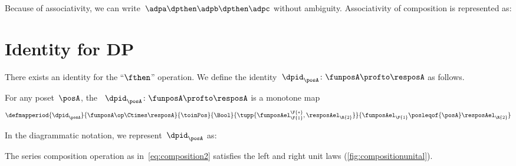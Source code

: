 Because of associativity, we can write~$\adpa\dpthen\adpb\dpthen\adpc$ without ambiguity.
Associativity of composition is represented as:

\section{Identity for DP}
There exists an identity for the ``$\fthen$'' operation.
We define the identity~$\dpid_\posA \colon \funposA \profto \resposA$ as follows.

\begin{definition}
    \label{def:dp-identity}
    For any poset~$\posA$, the \emph{}~$\dpid_\posA \colon \funposA \profto \resposA$ is a monotone map
    \begin{equation}
        \label{eq:identity}
        \defmapperiod{\dpid_\posA}{\funposA\op \Ctimes \resposA}{\toinPos}{\Bool}{\tupp{\funposAel_\F{1}^\F{*},\resposAel_\R{2}}}{\funposAel_\F{1} \posleqof{\posA} \resposAel_\R{2}}
    \end{equation}
\end{definition}
In the diagrammatic notation, we represent~$\dpid_\posA$ as:
%

\begin{lemma}
    \label{lem:compositionunital}
    The series composition operation as in~\cref{eq:composition2} satisfies the left and right unit laws (\cref{fig:compositionunital}).
\end{lemma}

